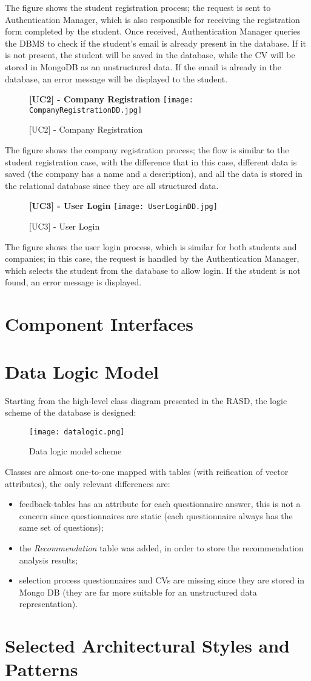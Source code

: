 		The figure shows the student registration process; the request is sent to Authentication Manager, which is also responsible for receiving the registration form completed by the student. Once received, Authentication Manager queries the DBMS to check if the student's email is already present in the database. If it is not present, the student will be saved in the database, while the CV will be stored in MongoDB as an unstructured data. If the email is already in the database, an error message will be displayed to the student.
		
		\begin{figure}[H]
			\centering
			{\bfseries [UC2] - Company Registration}
			\texttt{[image: CompanyRegistrationDD.jpg]}
			\caption{[UC2] - Company Registration}
		\end{figure}
		
		The figure shows the company registration process; the flow is similar to the student registration case, with the difference that in this case, different data is saved (the company has a name and a description), and all the data is stored in the relational database since they are all structured data.
		
		\begin{figure}[H]
			\centering
			{\bfseries [UC3] - User Login}
			\texttt{[image: UserLoginDD.jpg]}
			\caption{[UC3] - User Login}
		\end{figure}
		
		The figure shows the user login process, which is similar for both students and companies; in this case, the request is handled by the Authentication Manager, which selects the student from the database to allow login. If the student is not found, an error message is displayed.
	\section{Component Interfaces}
	\section{Data Logic Model}
		Starting from the high-level class diagram presented in the RASD, the logic scheme of the database is designed:
		\begin{figure}[H]
			\centering
			\texttt{[image: datalogic.png]}
			\caption{Data logic model scheme}
		\end{figure}
		Classes are almost one-to-one mapped with tables (with reification of vector attributes), the only relevant differences are:
		\begin{itemize}
			\item feedback-tables has an attribute for each questionnaire answer, this is not a concern since questionnaires are static (each questionnaire always has the same set of questions);
			\item the \emph{Recommendation} table was added, in order to store the recommendation analysis results;
			\item selection process questionnaires and CVs are missing since they are stored in Mongo DB (they are far more suitable for an unstructured data representation).
		\end{itemize}
	\section{Selected Architectural Styles and Patterns}